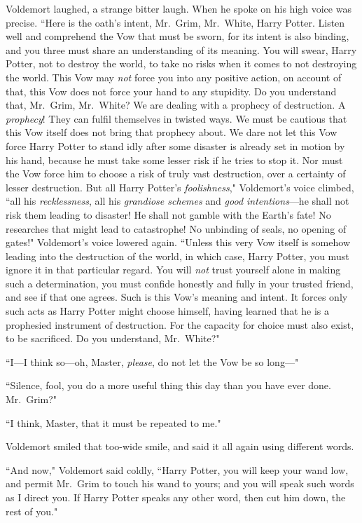 Voldemort laughed, a strange bitter laugh. When he spoke on his high voice was precise. ``Here is the oath's intent, Mr.~Grim, Mr.~White, Harry Potter. Listen well and comprehend the Vow that must be sworn, for its intent is also binding, and you three must share an understanding of its meaning. You will swear, Harry Potter, not to destroy the world, to take no risks when it comes to not destroying the world. This Vow may \emph{not} force you into any positive action, on account of that, this Vow does not force your hand to any stupidity. Do you understand that, Mr.~Grim, Mr.~White? We are dealing with a prophecy of destruction. A \emph{prophecy}! They can fulfil themselves in twisted ways. We must be cautious that this Vow itself does not bring that prophecy about. We dare not let this Vow force Harry Potter to stand idly after some disaster is already set in motion by his hand, because he must take some lesser risk if he tries to stop it. Nor must the Vow force him to choose a risk of truly vast destruction, over a certainty of lesser destruction. But all Harry Potter's \emph{foolishness}," Voldemort's voice climbed, ``all his \emph{recklessness}, all his \emph{grandiose schemes} and \emph{good intentions}—he shall not risk them leading to disaster! He shall not gamble with the Earth's fate! No researches that might lead to catastrophe! No unbinding of seals, no opening of gates!" Voldemort's voice lowered again. ``Unless this very Vow itself is somehow leading into the destruction of the world, in which case, Harry Potter, you must ignore it in that particular regard. You will \emph{not} trust yourself alone in making such a determination, you must confide honestly and fully in your trusted friend, and see if that one agrees. Such is this Vow's meaning and intent. It forces only such acts as Harry Potter might choose himself, having learned that he is a prophesied instrument of destruction. For the capacity for choice must also exist, to be sacrificed. Do you understand, Mr.~White?"

``I—I think so—oh, Master, \emph{please}, do not let the Vow be so long—"

``Silence, fool, you do a more useful thing this day than you have ever done. Mr.~Grim?"

``I think, Master, that it must be repeated to me."

Voldemort smiled that too-wide smile, and said it all again using different words.

``And now," Voldemort said coldly, ``Harry Potter, you will keep your wand low, and permit Mr.~Grim to touch his wand to yours; and you will speak such words as I direct you. If Harry Potter speaks any other word, then cut him down, the rest of you."

